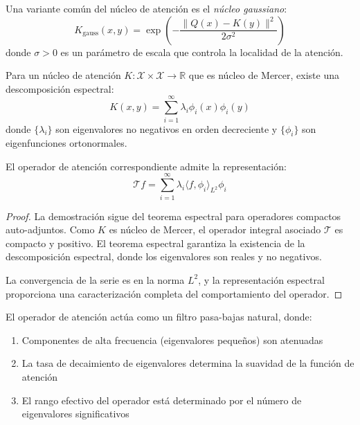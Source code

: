 \begin{definition}\label{def:gaussian_attention_kernel}
    Una variante común del núcleo de atención es el \textit{núcleo gaussiano}:
    \begin{equation}
        K_{\text{gauss}}(x, y) = \exp\left(-\frac{\|Q(x) - K(y)\|^2}{2\sigma^2}\right)
        \label{eq:gaussian_attention_kernel}
    \end{equation}
    donde $\sigma > 0$ es un parámetro de escala que controla la localidad de la atención.
\end{definition}

\begin{theorem}\label{theorem:spectral_decomposition_attention}
    Para un núcleo de atención $K: \mathcal{X} \times \mathcal{X} \to \mathbb{R}$ que es núcleo de Mercer, existe una descomposición espectral:
    \begin{equation}
        K(x, y) = \sum_{i=1}^{\infty} \lambda_i \phi_i(x) \phi_i(y)
        \label{eq:mercer_decomposition_attention}
    \end{equation}
    donde $\{\lambda_i\}$ son eigenvalores no negativos en orden decreciente y $\{\phi_i\}$ son eigenfunciones ortonormales.
    
    El operador de atención correspondiente admite la representación:
    \begin{equation}
        \mathcal{T}f = \sum_{i=1}^{\infty} \lambda_i \langle f, \phi_i \rangle_{L^2} \phi_i
        \label{eq:spectral_representation_attention}
    \end{equation}
\end{theorem}

\begin{proof}
    La demostración sigue del teorema espectral para operadores compactos auto-adjuntos. Como $K$ es núcleo de Mercer, el operador integral asociado $\mathcal{T}$ es compacto y positivo. El teorema espectral garantiza la existencia de la descomposición espectral, donde los eigenvalores son reales y no negativos.
    
    La convergencia de la serie es en la norma $L^2$, y la representación espectral proporciona una caracterización completa del comportamiento del operador.
\end{proof}

\begin{corollary}\label{cor:spectral_filtering}
    El operador de atención actúa como un filtro pasa-bajas natural, donde:
    \begin{enumerate}
        \item Componentes de alta frecuencia (eigenvalores pequeños) son atenuadas
        \item La tasa de decaimiento de eigenvalores determina la suavidad de la función de atención
        \item El rango efectivo del operador está determinado por el número de eigenvalores significativos
    \end{enumerate}
\end{corollary}

